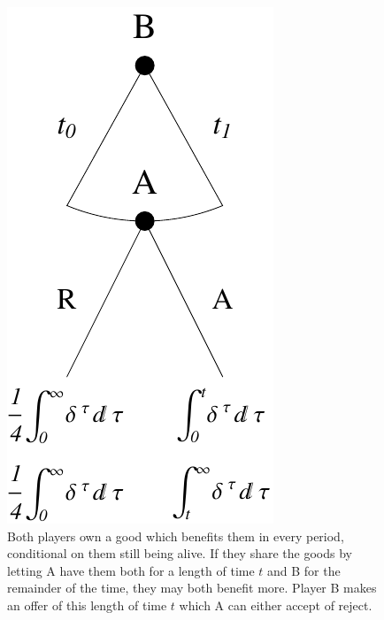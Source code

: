 \documentclass[a4paper,10pt]{article}
\numberwithin{equation}{section}
\begin{document}
\begin{figure}[h]
\begin{center}
\leavevmode
\includegraphics[scale=.68]{Graph12.pdf}
\captionsetup{width=380pt}
\caption{Both players own a good which benefits them in every period, conditional on them still being alive. If they share the goods by letting A have them both for a length of time $t$ and B for the remainder of the time, they may both benefit more. Player B makes an offer of this length of time $t$ which A can either accept of reject.}
\label{fig:Graph12.pdf}
\end{center}
\end{figure}
\end{document}
